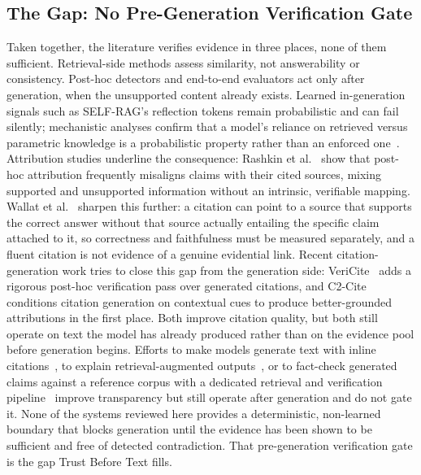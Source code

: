 \documentclass[conference]{IEEEtran}
\begin{document}
\subsection{The Gap: No Pre-Generation Verification Gate}
Taken together, the literature verifies evidence in three places, none of
them sufficient. Retrieval-side methods assess similarity, not
answerability or consistency. Post-hoc detectors and end-to-end evaluators
act only after generation, when the unsupported content already exists.
Learned in-generation signals such as SELF-RAG's reflection tokens remain
probabilistic and can fail silently; mechanistic analyses confirm that a
model's reliance on retrieved versus parametric knowledge is a probabilistic
property rather than an enforced one~\cite{sun2024redeep}. Attribution
studies underline the consequence: Rashkin et
al.~\cite{rashkin2023attribution} show that post-hoc attribution frequently
misaligns claims with their cited sources, mixing supported and unsupported
information without an intrinsic, verifiable mapping. Wallat et
al.~\cite{wallat2025correctness} sharpen this further: a citation can point
to a source that supports the correct answer without that source actually
entailing the specific claim attached to it, so correctness and faithfulness
must be measured separately, and a fluent citation is not evidence of a
genuine evidential link. Recent citation-generation work tries to close
this gap from the generation side: VeriCite~\cite{wang2025vericite} adds a
rigorous post-hoc verification pass over generated citations, and
C2-Cite~\cite{huang2026c2cite} conditions citation generation on contextual
cues to produce better-grounded attributions in the first place. Both
improve citation quality, but both still operate on text the model has
already produced rather than on the evidence pool before generation
begins. Efforts to make models
generate text with inline citations~\cite{gao2023alce}, to explain
retrieval-augmented outputs~\cite{rorseth2024explain}, or to fact-check
generated claims against a reference corpus with a dedicated retrieval and
verification pipeline~\cite{trokhymovych2021wikicheck} improve transparency
but still operate after generation and do not gate it. None of the systems
reviewed here provides a deterministic, non-learned boundary that blocks
generation until the evidence has been shown to be sufficient and free of
detected contradiction. That pre-generation
verification gate is the gap Trust Before Text fills.

\end{document}
